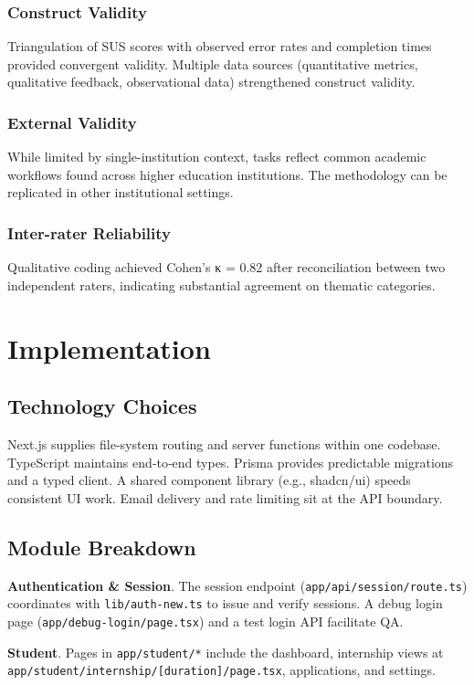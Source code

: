 \documentclass[conference]{IEEEtran}
\begin{document}
\subsubsection{Construct Validity}
Triangulation of SUS scores with observed error rates and completion times provided convergent validity. Multiple data sources (quantitative metrics, qualitative feedback, observational data) strengthened construct validity.

\subsubsection{External Validity}
While limited by single-institution context, tasks reflect common academic workflows found across higher education institutions. The methodology can be replicated in other institutional settings.

\subsubsection{Inter-rater Reliability}
Qualitative coding achieved Cohen's κ = 0.82 after reconciliation between two independent raters, indicating substantial agreement on thematic categories.

\section{Implementation}
\subsection{Technology Choices}
Next.js supplies file‑system routing and server functions within one codebase. TypeScript maintains end‑to‑end types. Prisma provides predictable migrations and a typed client. A shared component library (e.g., shadcn/ui) speeds consistent UI work. Email delivery and rate limiting sit at the API boundary.

\subsection{Module Breakdown}
\textbf{Authentication \& Session}. The session endpoint (\texttt{app/api/session/route.ts}) coordinates with \texttt{lib/auth-new.ts} to issue and verify sessions. A debug login page (\texttt{app/debug-login/page.tsx}) and a test login API facilitate QA.

\textbf{Student}. Pages in \texttt{app/student/*} include the dashboard, internship views at \texttt{app/student/internship/[duration]/page.tsx}, applications, and settings.
\end{document}
